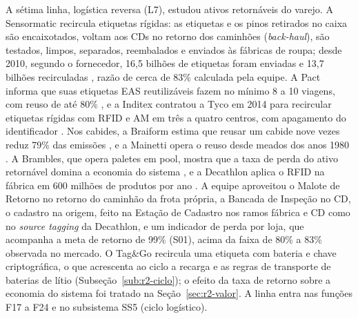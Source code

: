 A sétima linha, logística reversa (L7), estudou ativos retornáveis do varejo. A Sensormatic recircula etiquetas rígidas: as etiquetas e os pinos retirados no caixa são encaixotados, voltam aos CDs no retorno dos caminhões (\textit{back-haul}), são testados, limpos, separados, reembalados e enviados às fábricas de roupa; desde 2010, segundo o fornecedor, 16,5 bilhões de etiquetas foram enviadas e 13,7 bilhões recirculadas \cite{sensormatic2024recirculacao}, razão de cerca de 83\% calculada pela equipe. A Pact informa que suas etiquetas EAS reutilizáveis fazem no mínimo 8 a 10 viagens, com reuso de até 80\% \cite{pact2026etiquetas}, e a Inditex contratou a Tyco em 2014 para recircular etiquetas rígidas com RFID e AM em três a quatro centros, com apagamento do identificador \cite{rfidjournal2014inditex}. Nos cabides, a Braiform estima que reusar um cabide nove vezes reduz 79\% das emissões \cite{braiform2018cabides}, e a Mainetti opera o reuso desde meados dos anos 1980 \cite{mainetti2018cabides}. A Brambles, que opera paletes em pool, mostra que a taxa de perda do ativo retornável domina a economia do sistema \cite{brambles2025resultados}, e a Decathlon aplica o RFID na fábrica em 600 milhões de produtos por ano \cite{rfidnews2026decathlon}. A equipe aproveitou o Malote de Retorno no retorno do caminhão da frota própria, a Bancada de Inspeção no CD, o cadastro na origem, feito na Estação de Cadastro nos ramos fábrica e CD como no \textit{source tagging} da Decathlon, e um indicador de perda por loja, que acompanha a meta de retorno de 99\% (S01), acima da faixa de 80\% a 83\% observada no mercado. O Tag\&Go recircula uma etiqueta com bateria e chave criptográfica, o que acrescenta ao ciclo a recarga e as regras de transporte de baterias de lítio (Subseção~\ref{sub:r2-ciclo}); o efeito da taxa de retorno sobre a economia do sistema foi tratado na Seção~\ref{sec:r2-valor}. A linha entra nas funções F17 a F24 e no subsistema SS5 (ciclo logístico).


